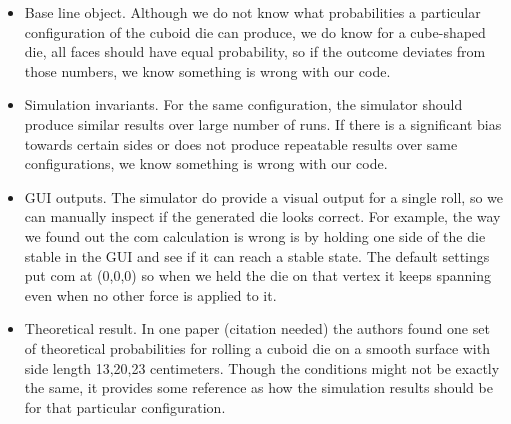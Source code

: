 \begin{itemize}
    \item Base line object. Although we do not know what probabilities a particular configuration of the cuboid die can produce, we do know for a cube-shaped die, all faces should have equal probability, so if the outcome deviates from those numbers, we know something is wrong with our code.\\
    \item Simulation invariants. For the same configuration, the simulator should produce similar results over large number of runs. If there is a significant bias towards certain sides or does not produce repeatable results over same configurations, we know something is wrong with our code.\\
    \item GUI outputs. The simulator do provide a visual output for a single roll, so we can manually inspect if the generated die looks correct. For example, the way we found out the com calculation is wrong is by holding one side of the die stable in the GUI and see if it can reach a stable state. The default settings put com at (0,0,0) so when we held the die on that vertex it keeps spanning even when no other force is applied to it.\\
    \item Theoretical result. In one paper (citation needed) the authors found one set of theoretical probabilities for rolling a cuboid die on a smooth surface with side length 13,20,23 centimeters. Though the conditions might not be exactly the same, it provides some reference as how the simulation results should be for that particular configuration.
    
\end{itemize}

